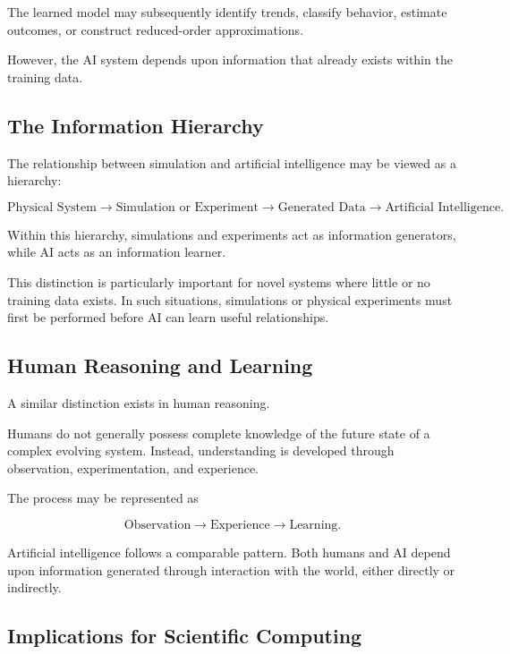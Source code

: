 \documentclass[11pt]{article}
\begin{document}
The learned model may subsequently identify trends, classify behavior,
estimate outcomes, or construct reduced-order approximations.

However, the AI system depends upon information that already exists
within the training data.

\subsection{The Information Hierarchy}

The relationship between simulation and artificial intelligence may be
viewed as a hierarchy:

\begin{equation}
\text{Physical System}
\rightarrow
\text{Simulation or Experiment}
\rightarrow
\text{Generated Data}
\rightarrow
\text{Artificial Intelligence}.
\end{equation}

Within this hierarchy, simulations and experiments act as information
generators, while AI acts as an information learner.

This distinction is particularly important for novel systems where
little or no training data exists. In such situations, simulations or
physical experiments must first be performed before AI can learn useful
relationships.

\subsection{Human Reasoning and Learning}

A similar distinction exists in human reasoning.

Humans do not generally possess complete knowledge of the future state
of a complex evolving system. Instead, understanding is developed
through observation, experimentation, and experience.

The process may be represented as

\begin{equation}
\text{Observation}
\rightarrow
\text{Experience}
\rightarrow
\text{Learning}.
\end{equation}

Artificial intelligence follows a comparable pattern. Both humans and
AI depend upon information generated through interaction with the world,
either directly or indirectly.

\subsection{Implications for Scientific Computing}
\end{document}
